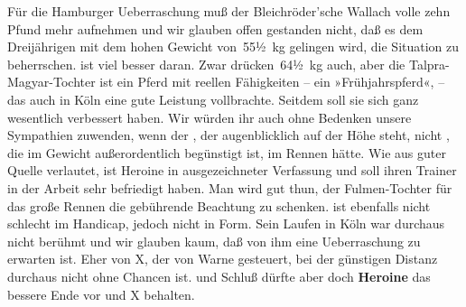 \begin{ledgroupsized}[t]{13cm}
{{                  Für die Hamburger Ueberraschung muß der Bleichröder’sche Wallach volle zehn Pfund
                  mehr aufnehmen und wir glauben offen gestanden nicht, daß es dem Dreijährigen mit
                  dem hohen Gewicht von 55½ kg gelingen wird, die Situation zu beherrschen.  ist viel besser daran. Zwar drücken 64½ kg auch, aber die Talpra-Magyar-Tochter ist ein Pferd mit
                  reellen Fähigkeiten – ein »Frühjahrspferd«, – das auch in Köln eine gute Leistung vollbrachte. Seitdem soll sie sich
                  ganz wesentlich verbessert haben. Wir würden ihr auch ohne Bedenken unsere
                  Sympathien zuwenden, wenn der , der augenblicklich auf der Höhe steht, nicht , die im Gewicht außerordentlich begünstigt ist, im Rennen hätte.
                  Wie aus guter Quelle verlautet, ist Heroine in ausgezeichneter Verfassung und soll
                  ihren Trainer in der Arbeit sehr befriedigt haben. Man wird gut thun, der Fulmen-Tochter für das große Rennen die gebührende Beachtung zu schenken.
                      ist ebenfalls nicht schlecht im Handicap,
                  jedoch nicht in Form. Sein Laufen in Köln war
                  durchaus nicht berühmt und wir glauben kaum, daß von ihm eine Ueberraschung zu
                  erwarten ist. Eher von X, der von Warne
                  gesteuert, bei der günstigen Distanz durchaus nicht ohne Chancen ist.  und  Schluß
                  dürfte aber doch \textbf{Heroine} das bessere Ende vor  und X behalten.}}\pend
           
         
         \endnumbering{}\end{ledgroupsized}\begin{anhang}\end{anhang}\newcommand{\dateiname}{L02914}\newcommand{\titel}{Paul Goldmann an Arthur Schnitzler, 2. 5. [1900]}\newcommand{\editorInnen}{Martin Anton Müller und Laura Untner}
      